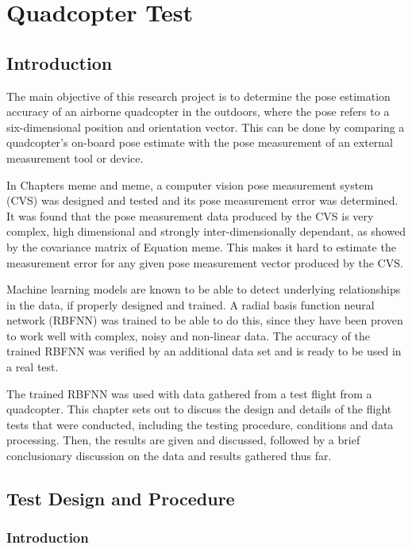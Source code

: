 \chapter{Quadcopter Test}
\label{chap5}

\section{Introduction}

The main objective of this research project is to determine the pose estimation accuracy of an airborne quadcopter in the outdoors, where the pose refers to a six-dimensional position and orientation vector. This can be done by comparing a quadcopter's on-board pose estimate with the pose measurement of an external measurement tool or device.  

In Chapters meme and meme, a computer vision pose measurement system (CVS) was designed and tested and its pose measurement error was determined. It was found that the pose measurement data produced by the CVS is very complex, high dimensional and strongly inter-dimensionally dependant, as showed by the covariance matrix of Equation meme. This makes it hard to estimate the measurement error for any given pose measurement vector produced by the CVS.\@ 

Machine learning models are known to be able to detect underlying relationships in the data, if properly designed and trained. A radial basis function neural network (RBFNN) was trained to be able to do this, since they have been proven to work well with complex, noisy and non-linear data. The accuracy of the trained RBFNN was verified by an additional data set and is ready to be used in a real test. 

The trained RBFNN was used with data gathered from a test flight from a quadcopter. This chapter sets out to discuss the design and details of the flight tests that were conducted, including the testing procedure, conditions and data processing. Then, the results are given and discussed, followed by a brief conclusionary discussion on the data and results gathered thus far. 

\section{Test Design and Procedure}

\subsection{Introduction}

